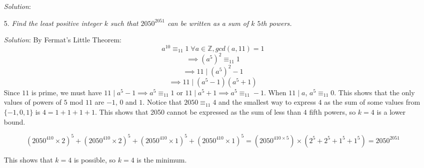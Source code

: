 \documentclass{article}
\begin{document}
\begin{enumerate}[1.]
\textit{Solution}:
\vspace{6.81mm}

\item[5.] %
\textit{Find the least positive integer $k$ such that $2050^{2051}$ can be written as a sum of $k$ $5$th powers.}

\textit{Solution}: 
By Fermat's Little Theorem: 
$$a^{10} \equiv _{11} 1 \; \forall a \in \mathbb{Z}, gcd(a, 11) = 1$$ 
$$\implies (a^5)^2 \equiv _{11} 1$$
$$\implies 11 \; | \; (a^5)^2 - 1$$
$$\implies 11 \; | \; (a^5 - 1)(a^5 + 1)$$
Since $11$ is prime, we must have $11 \; | \; a^5 - 1 \implies a^5 \equiv _{11} 1$ or $11 \; | \; a^5 + 1 \implies a^5 \equiv _{11} -1$. When $11 \; | \; a$, $a^5 \equiv _{11} 0$.
This shows that the only values of powers of $5$ mod $11$ are $-1$, $0$ and $1$. Notice that $2050 \equiv _{11} 4$ and the smallest way to express $4$ as the sum of some values from $\{-1, 0, 1\}$ is $4 = 1 + 1 + 1 + 1$.
This shows that 2050 cannot be expressed as the sum of less than $4$ fifth powers, so $k = 4$ is a lower bound.

$$(2050^{410} \times 2)^5 + (2050^{410} \times 2)^5 + (2050^{410} \times 1)^5 + (2050^{410} \times 1)^5 = (2050^{410 \times 5}) \times (2^5 + 2^5 + 1^5 + 1^5) = 2050^{2051}$$

This shows that $k = 4$ is possible, so $k = 4$ is the minimum.

\end{enumerate}
\end{document}
